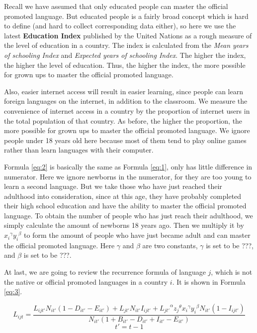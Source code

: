 \documentclass{mcmthesis}
\begin{document}
Recall we have assumed that only educated people can master the official promoted language. But educated people is a fairly broad concept which is hard to define (and hard to collect corresponding data either), so here we use the latest \textbf{Education Index} published by the United Nations as a rough measure of the level of education in a country. The index is calculated from the \textit{Mean years of schooling Index} and \textit{Expected years of schooling Index}. The higher the index, the higher the level of education. Thus, the higher the index, the more possible for grown ups to master the official promoted language.

Also, easier internet access will result in easier learning, since people can learn foreign languages on the internet, in addition to the classroom. We measure the convenience of internet access in a country by the proportion of internet users in the total population of that country. As before, the higher the proportion, the more possible for grown ups to master the official promoted language. We ignore people under 18 years old here because most of them tend to play online games rather than learn languages with their computer.

Formula \ref{eq:2} is basically the same as Formula \ref{eq:1}, only has little difference in numerator. Here we ignore newborns in the numerator, for they are too young to learn a second language. But we take those who have just reached their adulthood into consideration, since at this age, they have probably completed their high school education and have the ability to master the official promoted language. To obtain the number of people who has just reach their adulthood, we simply calculate the amount of newborns 18 years ago. Then we multiply it by ${x_i}^\gamma {y_i}^\beta$ to form the amount of people who have just became adult and can master the official promoted language. Here $\gamma$ and $\beta$ are two constants, $\gamma$ is set to be ???, and $\beta$ is set to be ???.

At last, we are going to review the recurrence formula of language $j$, which is not the native or official promoted languages in a country $i$. It is shown in Formula \ref{eq:3}.

\begin{equation} \label{eq:3}
    L_{ijt}=\frac{L_{ijt'}N_{it'}(1-D_{it'}-E_{it'})+L_{jt'}N_{it'}I_{ijt'}+{L_{jt'}}^\alpha {z_j}^\theta {x_i}^\gamma {y_i}^\beta N_{it'} (1-I_{ijt'})}{N_{it'}(1+B_{it'}-D_{it'}+I_{it'}-E_{it'})}
\end{equation}
\begin{equation*}
    t'=t-1
\end{equation*}
\end{document}
